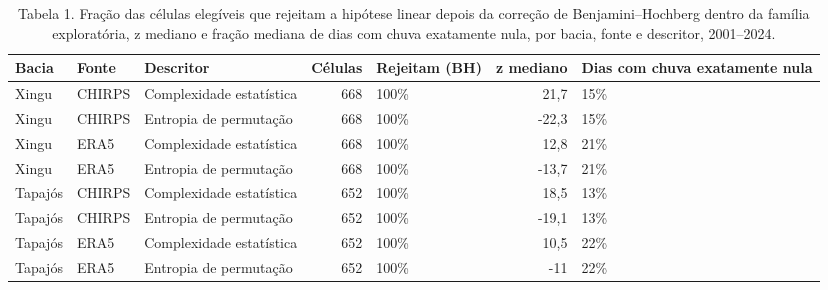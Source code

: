 \begin{table}
\caption{Tabela 1. Fração das células elegíveis que rejeitam a hipótese linear depois da correção de Benjamini–Hochberg dentro da família exploratória, z mediano e fração mediana de dias com chuva exatamente nula, por bacia, fonte e descritor, 2001–2024.}
\label{tab:09_chuva::rejeicao}
\begin{tabular}{lllrlrl}
\toprule
Bacia & Fonte & Descritor & Células & Rejeitam (BH) & z mediano & Dias com chuva exatamente nula \\
\midrule
Xingu & CHIRPS & Complexidade estatística & 668 & 100\% & 21,7 & 15\% \\
Xingu & CHIRPS & Entropia de permutação & 668 & 100\% & -22,3 & 15\% \\
Xingu & ERA5 & Complexidade estatística & 668 & 100\% & 12,8 & 21\% \\
Xingu & ERA5 & Entropia de permutação & 668 & 100\% & -13,7 & 21\% \\
Tapajós & CHIRPS & Complexidade estatística & 652 & 100\% & 18,5 & 13\% \\
Tapajós & CHIRPS & Entropia de permutação & 652 & 100\% & -19,1 & 13\% \\
Tapajós & ERA5 & Complexidade estatística & 652 & 100\% & 10,5 & 22\% \\
Tapajós & ERA5 & Entropia de permutação & 652 & 100\% & -11 & 22\% \\
\bottomrule
\end{tabular}
\end{table}
